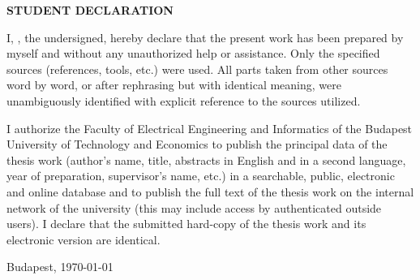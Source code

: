 
\begin{center}
\large
\textbf{STUDENT DECLARATION}\\
\end{center}

I, \emph{\vikszerzoVezeteknev{} \vikszerzoKeresztnev}, the undersigned, hereby declare that the present \vikdoktipus{} work has been prepared by myself and without any unauthorized help or assistance. Only the specified sources (references, tools, etc.) were used. All parts taken from other sources word by word, or after rephrasing but with identical meaning, were unambiguously identified with explicit reference to the sources utilized.

I authorize the Faculty of Electrical Engineering and Informatics of the Budapest University of Technology and Economics to publish the principal data of the thesis work (author's name, title, abstracts in English and in a second language, year of preparation, supervisor's name, etc.) in a searchable, public, electronic and online database and to publish the full text of the thesis work on the internal network of the university (this may include access by authenticated outside users). I declare that the submitted hard-copy of the thesis work and its electronic version are identical. 

\begin{flushleft}
\vspace*{1cm}
Budapest, \today
\end{flushleft}

\begin{flushright}
 \vspace*{1cm}
 \makebox[7cm]{\rule{6cm}{.4pt}}\\
 \makebox[7cm]{\emph{\vikszerzoVezeteknev{} \vikszerzoKeresztnev}}\\
\end{flushright}
\thispagestyle{empty}

\vfill
\clearpage
\thispagestyle{empty} %

\selectthesislanguage
